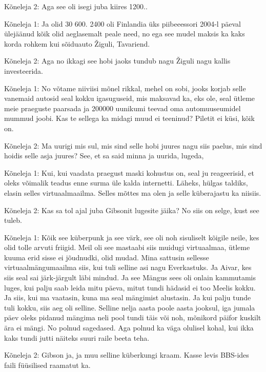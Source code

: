 Kõneleja 2:
Aga see oli isegi juba kiires 1200..
                 
Kõneleja 1:
Ja olid 30 600. 2400 oli Finlandia üks piibeeessori 2004-l päeval ülejäänud kõik olid aeglasemalt peale need, no ega see mudel maksis ka kaks korda rohkem kui sõiduauto Žiguli, Tavariend.
                 
Kõneleja 2:
Aga no ikkagi see hobi jaoks tundub nagu Žiguli nagu kallis investeerida.
                 
Kõneleja 1:
No võtame niiviisi mõnel rikkal, mehel on sobi, jooks korjab selle vanemaid autosid seal kokku igasuguseid, mis maksavad ka, eks ole, seal ütleme meie praeguste paarsada ja 200000 uunikumi teevad oma automuuseumidel mummud joobi. Kas te sellega ka midagi muud ei teeninud? Piletit ei küsi, kõik on.
                 
Kõneleja 2:
Ma uurigi mis sul, mis sind selle hobi juures nagu siis paelus, mis sind hoidis selle asja juures?
See, et sa said minna ja uurida, lugeda,
                 
Kõneleja 1:
Kui, kui vaadata praegust maski kohustus on, seal ju reageerisid, et oleks võimalik teadus enne surma üle kalda internetti. Läheks, hülgas taldiks, elasin selles virtuaalmaailma. Selles mõttes ma olen ja selle küberajastu ka niisiis.
                 
Kõneleja 2:
Kas sa tol ajal juba Gibsonit lugesite jäika? No siis on selge, kust see tuleb.
                 
Kõneleja 1:
Kõik see küberpunk ja see värk, see oli noh sisuliselt kõigile neile, kes olid tolle arvuti friigid. Meil oli see mastaabi siis muidugi virtuaalmaa, ütleme kuuma erid sisse ei jõudnudki, olid mudad. Mina sattusin sellesse virtuaalmängumaailma siis, kui tuli selline asi nagu Everkastuks. Ja Aivar, kes siis seal sai järk-järgult läbi mindud. Ja see
Mängus sees oli onlain kammutamis luges, kui palju saab leida mitu päeva, mitut tundi hädasid ei too Meelis kokku. Ja siis, kui ma vaatasin, kuna ma seal mängimist alustasin. Ja kui palju tunde tuli kokku, siis aeg oli selline. Selline nelja aasta poole aasta jooksul, iga jumala päev oleks pidanud mängima neli pool tundi täis või noh, mõnikord päifor kuskilt ära ei mängi. No polnud sagedased. Aga polnud ka väga olulisel kohal, kui ikka kaks tundi jutti näiteks suuri raile beeta teha.
                 
Kõneleja 2:
Gibson ja, ja muu selline küberkungi kraam. Kasse levis BBS-ides faili füüsilised raamatut ka.
                 
